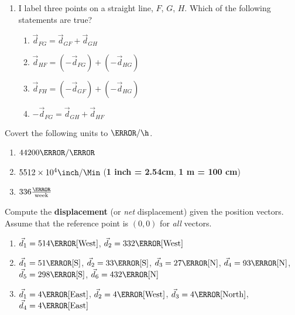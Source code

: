 \documentclass[12pt]{article} %
\newcommand{\tx}[1]{\text{#1}}
\begin{document}
\begin{qstn}[2]
\begin{enumerate}
		
		\item I label three points on a straight line, $F$, $G$, $H$. Which of the following statements are true?
			\begin{enumerate}[label = (\alph*)]
				\item $\vec d_{FG} = \vec d_{GF} + \vec d_{GH}$
				\item $\vec d_{HF} = (-\vec d_{FG}) + (-\vec d_{HG})$
				\item $\vec d_{FH} = (-\vec d_{GF}) + (-\vec d_{HG})$
				\item $-\vec d_{FG} = \vec d_{GH} + \vec d_{HF}$
			\end{enumerate}
	\end{enumerate}
	
\end{qstn}

\begin{qstn}[3]
Covert the following units to $\km / \h$. 
\begin{enumerate}[label = (\alph*)]
	\item $44200 \m / \s$
	\vspace*{5cm}

	\item $5512 \times 10^4 \inch / \Min$ \hspace*{6cm} (\textbf{1 inch = 2.54cm}, \textbf{1 m = 100 cm})
	\vspace*{5cm}

	\item $336 \frac{\km}{\text{week}}$
\end{enumerate}


\end{qstn}

\begin{qstn}[4]
	Compute the \textbf{displacement} (or \emph{net} displacement) given the position vectors. Assume that the reference point is $(0,0)$ for \emph{all} vectors.
    \begin{enumerate}[label=(\alph*)]
        \item $\vec d_1 = 514 \tx{\m}[\tx{West}]$, $\vec d_2 = 332 \tx{\m}[\tx{West}]$
         \vspace*{4cm}
        \item $\vec d_1 = 51 \tx{\m}[\tx{S}]$, $\vec d_2 = 33 \tx{\m}[\tx{S}]$, $\vec d_3 = 27 \tx{\m}[\tx{N}]$, $\vec d_4 = 93 \tx{\m}[\tx{N}]$,$\vec d_5 = 298 \tx{\m}[\tx{S}]$, $\vec d_6 = 432 \tx{\m}[\tx{N}]$
        \vspace*{4cm}
        \item $\vec d_1 = 4\tx{\m}[\tx{East}]$, $\vec d_2 = 4\tx{\m}[\tx{West}]$, $\vec d_3 = 4\tx{\m}[\tx{North}]$, $\vec d_4 = 4\tx{\m}[\tx{East}]$
		\vspace*{5cm}
    \end{enumerate}
\end{qstn}
\end{document}

